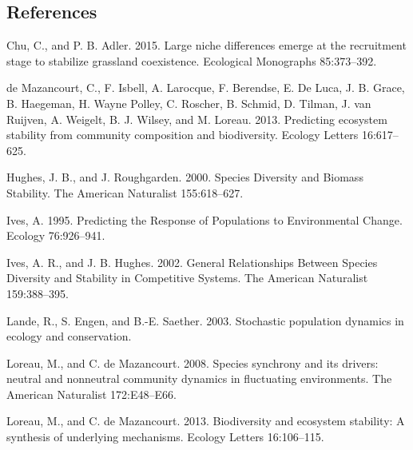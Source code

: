 \documentclass[12pt,]{article}
\begin{document}
\newpage{}

\subsection*{References}\label{references}

Chu, C., and P. B. Adler. 2015. Large niche differences emerge at the
recruitment stage to stabilize grassland coexistence. Ecological
Monographs 85:373--392.

{{de Mazancourt}}, C., F. Isbell, A. Larocque, F. Berendse, E. {De
Luca}, J. B. Grace, B. Haegeman, H. {Wayne Polley}, C. Roscher, B.
Schmid, D. Tilman, J. van Ruijven, A. Weigelt, B. J. Wilsey, and M.
Loreau. 2013. Predicting ecosystem stability from community composition
and biodiversity. Ecology Letters 16:617--625.

Hughes, J. B., and J. Roughgarden. 2000. Species Diversity and Biomass
Stability. The American Naturalist 155:618--627.

Ives, A. 1995. Predicting the Response of Populations to Environmental
Change. Ecology 76:926--941.

Ives, A. R., and J. B. Hughes. 2002. General Relationships Between
Species Diversity and Stability in Competitive Systems. The American
Naturalist 159:388--395.

Lande, R., S. Engen, and B.-E. Saether. 2003. Stochastic population
dynamics in ecology and conservation.

Loreau, M., and C. {{de Mazancourt}}. 2008. Species synchrony and its
drivers: neutral and nonneutral community dynamics in fluctuating
environments. The American Naturalist 172:E48--E66.

Loreau, M., and C. {{de Mazancourt}}. 2013. Biodiversity and ecosystem
stability: A synthesis of underlying mechanisms. Ecology Letters
16:106--115.
\end{document}
